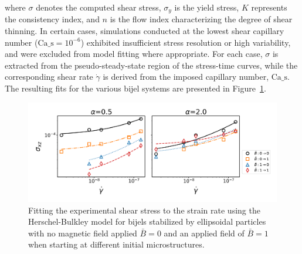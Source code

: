 where $\sigma$ denotes the computed shear stress, $\sigma_y$ is the yield stress, $K$ represents the consistency index, 
and $n$ is the flow index characterizing the degree of shear thinning. In certain cases, simulations conducted at the lowest shear capillary number 
($ \text{Ca_s} = 10^{-6}$) exhibited insufficient stress resolution or high variability, and were excluded from model fitting where appropriate. For each case, 
$\sigma$ is extracted from the pseudo-steady-state region of the stress-time curves, while the corresponding shear rate $\dot{\gamma}$ is derived from 
the imposed capillary number, $\text{Ca_s}$. The resulting fits for the various bijel systems are presented in Figure~\ref{fig:stress_strain}.

\begin{figure} 
    \centering 
    \includegraphics[scale=0.5]{../figures/results/paper3/stress_strain-all.png} 
    \caption{Fitting the experimental shear stress to the strain rate using the Herschel-Bulkley model for bijels stabilized by
             ellipsoidal particles with no magnetic field applied $\bar{B} = 0$ and an applied field of $\bar{B} = 1$ when starting at different
             initial microstructures.} 
    \label{fig:stress_strain} 
\end{figure}

